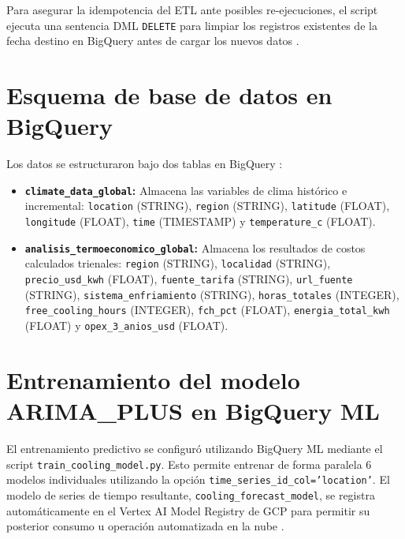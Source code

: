 Para asegurar la idempotencia del ETL ante posibles re-ejecuciones, el script ejecuta una sentencia DML \texttt{DELETE} para limpiar los registros existentes de la fecha destino en BigQuery antes de cargar los nuevos datos \cite{google2023}.

\section{Esquema de base de datos en BigQuery}\label{sec:esquema_bigquery}
Los datos se estructuraron bajo dos tablas en BigQuery \cite{google2023}:
\begin{itemize}
    \item \textbf{\texttt{climate\_data\_global}:} Almacena las variables de clima hist\'orico e incremental: \texttt{location} (STRING), \texttt{region} (STRING), \texttt{latitude} (FLOAT), \texttt{longitude} (FLOAT), \texttt{time} (TIMESTAMP) y \texttt{temperature\_c} (FLOAT).
    \item \textbf{\texttt{analisis\_termoeconomico\_global}:} Almacena los resultados de costos calculados trienales: \texttt{region} (STRING), \texttt{localidad} (STRING), \texttt{precio\_usd\_kwh} (FLOAT), \texttt{fuente\_tarifa} (STRING), \texttt{url\_fuente} (STRING), \texttt{sistema\_enfriamiento} (STRING), \texttt{horas\_totales} (INTEGER), \texttt{free\_cooling\_hours} (INTEGER), \texttt{fch\_pct} (FLOAT), \texttt{energia\_total\_kwh} (FLOAT) y \texttt{opex\_3\_anios\_usd} (FLOAT).
\end{itemize}

\section{Entrenamiento del modelo ARIMA\_PLUS en BigQuery ML}\label{sec:modelo_arima}
El entrenamiento predictivo se configur\'o utilizando BigQuery ML mediante el script \texttt{train\_cooling\_model.py}. Esto permite entrenar de forma paralela 6 modelos individuales utilizando la opci\'on \texttt{time\_series\_id\_col='location'}. El modelo de series de tiempo resultante, \texttt{cooling\_forecast\_model}, se registra autom\'aticamente en el Vertex AI Model Registry de GCP para permitir su posterior consumo u operaci\'on automatizada en la nube \cite{masnet2020}.

\shorthandon{<}\shorthandon{>}
